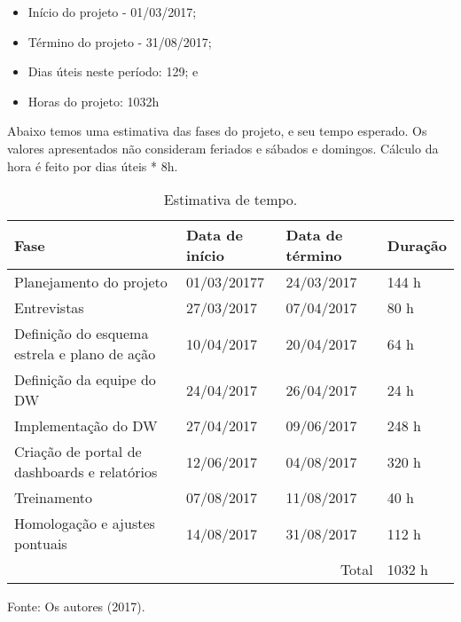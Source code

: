 \begin{itemize}
    \item Início do projeto - 01/03/2017;    
    \item Término do projeto - 31/08/2017;    
    \item Dias úteis neste período: 129; e
    \item Horas do projeto: 1032h
\end{itemize}

Abaixo temos uma estimativa das fases do projeto, e seu tempo esperado.
Os valores apresentados não consideram feriados e sábados e domingos. Cálculo da hora é feito por dias úteis * 8h.

\begin{table}[!htb]
    \begin{center}
        \caption{Estimativa de tempo.} \label{tab:tempo}
        \begin{tabular}{ p{3cm} |  p{2.2cm} | p{2.3cm} | p{1.2cm} }
            \hline
            \textbf{Fase} & \textbf{Data de início}  & \textbf{Data de término} & \textbf{Duração} \\
            \hline
            Planejamento do projeto & 01/03/20177 & 24/03/2017 & 144 h \\
            \hline
            Entrevistas &
            27/03/2017 &
            07/04/2017 &
            80 h \\
            \hline
            Definição do esquema estrela e plano de ação &
            10/04/2017 &
            20/04/2017 &
            64 h \\
            \hline        
            Definição da equipe do DW &
            24/04/2017 &
            26/04/2017 &
            24 h \\
            \hline 
            Implementação do DW &
            27/04/2017 &
            09/06/2017 &
            248 h \\
            \hline            
            Criação de portal de dashboards e relatórios &
            12/06/2017 &
            04/08/2017 &
            320 h \\
            \hline 
            Treinamento &
            07/08/2017 &
            11/08/2017 &
            40 h \\
            \hline
            Homologação e ajustes pontuais &
            14/08/2017 &
            31/08/2017 &
            112 h \\
            \hline
            \multicolumn{3}{r|}{Total} & 1032 h \\
            \hline

        \end{tabular}
    \end{center}
    Fonte: Os autores (2017).
\end{table}


